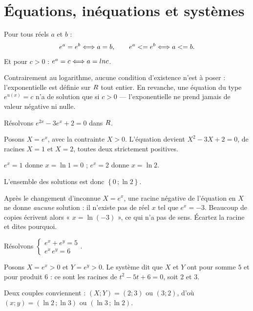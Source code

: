 \section{Équations, inéquations et systèmes}

\begin{propriete}
Pour tous réels $a$ et $b$ :
\[
  e^{a} = e^{b} \Longleftrightarrow a = b, \qquad e^{a} <= e^{b} \Longleftrightarrow a <= b .
\]
Et pour $c>0$ : $e^{a} = c \Longleftrightarrow a = ln c$.
\end{propriete}

\begin{remarque}
Contrairement au logarithme, aucune condition d'existence n'est à poser :
l'exponentielle est définie sur $R$ tout entier. En revanche, une équation du
type $e^{u(x)} = c$ n'a de solution que si $c>0$ — l'exponentielle ne prend
jamais de valeur négative ni nulle.
\end{remarque}

\begin{exemple}
Résolvons $e^{2x} - 3e^{x} + 2 = 0$ dans $R$.

Posons $X = e^{x}$, avec la contrainte $X>0$. L'équation devient
$X^{2}-3X+2 = 0$, de racines $X = 1$ et $X = 2$, toutes deux strictement
positives.

\smallskip
$e^{x} = 1$ donne $x = \ln 1 = 0$ ; \quad $e^{x} = 2$ donne $x = \ln 2$.

\smallskip
L'ensemble des solutions est donc $\left\{0\,;\ln 2\right\}$.
\end{exemple}

\begin{erreurclassique}
Après le changement d'inconnue $X = e^{x}$, une racine négative de l'équation
en $X$ ne donne \emph{aucune} solution : il n'existe pas de réel $x$ tel que
$e^{x} = -3$. Beaucoup de copies écrivent alors « $x = \ln(-3)$ », ce qui n'a
pas de sens. Écartez la racine et dites pourquoi.
\end{erreurclassique}

\begin{exemple}
Résolvons
$\begin{cases} e^{x} + e^{y} = 5 \\ e^{x}\,e^{y} = 6 \end{cases}$.

Posons $X = e^{x}>0$ et $Y = e^{y}>0$. Le système dit que $X$ et $Y$ ont pour
somme $5$ et pour produit $6$ : ce sont les racines de $t^{2}-5t+6 = 0$, soit
$2$ et $3$.

Deux couples conviennent : $(X;Y) = (2;3)$ ou $(3;2)$, d'où
$(x;y) = (\ln 2\,;\ln 3)$ ou $(\ln 3\,;\ln 2)$.
\end{exemple}

